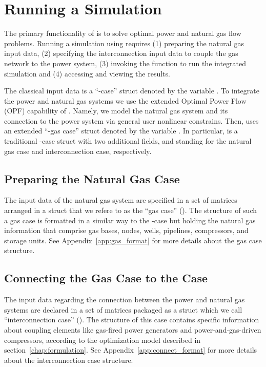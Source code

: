 \section{Running a Simulation}
\label{sec:simulate}

The primary functionality of \mpng{} is to solve optimal power and natural gas flow problems. Running a simulation using \mpng{} requires (1) preparing the natural gas input data, (2) specifying the interconnection input data to couple the gas network to the power system, (3) invoking the function to run the integrated simulation and (4) accessing and viewing the results.

The classical \matpower{} input data is a ``\matpower{}-case'' struct denoted by the variable \cite{matpower_manual}. To integrate the power and natural gas systems we use the extended Optimal Power Flow (OPF) capability of \matpower{}. Namely, we model the natural gas system and its connection to the power system via general user nonlinear constrains. Then, \mpng{} uses an extended ``\matpower{}-gas case'' struct denoted by the variable . In particular,  is a traditional \matpower{}-case struct with two additional fields,  and  standing for the natural gas case and interconnection case, respectively.

\subsection{Preparing the Natural Gas Case}
\label{subsec:gas_case}

The input data of the natural gas system are specified in a set of matrices arranged in a \matlab{} struct that we refere to as the ``gas case'' (). The structure of such a gas case is formatted in a similar way to the \matpower{}-case but holding the natural gas information that comprise gas bases, nodes, wells, pipelines, compressors, and storage units. See Appendix~\ref{app:gas_format} for more details about the gas case structure.

\subsection{Connecting the Gas Case to the \matpower{} Case}
\label{subsec:connect_case}

The input data regarding the connection between the power and natural gas systems are declared in a set of matrices packaged as a \matlab{} struct which we call ``interconnection case'' (). The structure of this case contains specific information about coupling elements like gas-fired power generators and power-and-gas-driven compressors, according to the optimization model described in section~\ref{chap:formulation}. See Appendix~\ref{app:connect_format} for more details about the interconnection case structure.

